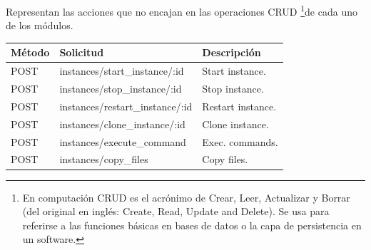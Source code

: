 \documentclass[conference, spanish]{IEEEtran}
\begin{document}
Representan las acciones que no encajan en las operaciones CRUD \footnote{En computación CRUD es el acrónimo de Crear, Leer, Actualizar y Borrar (del original en inglés: Create, Read, Update and Delete). Se usa para referirse a las funciones básicas en bases de datos o la capa de persistencia en un software.}de cada uno de los módulos.

\begin{center}
 \begin{tabular}{| l | l | l |}
 \hline
  \textbf{Método} & \textbf{Solicitud} & \textbf{Descripción} \\ [0.5ex] 
  \hline\hline
  POST & instances/start\_instance/:id & Start instance. \\
  \hline
  POST & instances/stop\_instance/:id & Stop instance. \\
  \hline
  POST & instances/restart\_instance/:id & Restart instance. \\
  \hline
  POST & instances/clone\_instance/:id & Clone instance. \\
  \hline
  POST & instances/execute\_command & Exec. commands. \\
  \hline
  POST & instances/copy\_files & Copy files. \\
  \hline
\end{tabular}
\end{center}






%
%
\end{document}
